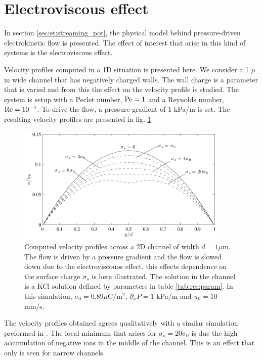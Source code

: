 \section{Electroviscous effect}
In section \ref{sec:et:streaming_pot}, the physical model behind
pressure-driven electrokinetic flow is presented. The effect of
interest that arise in this kind of systems is the electroviscous
effect.

Velocity profiles computed in a 1D situation is presented here. We
consider a 1 $\mu$m wide channel that has negatively charged
walls. The wall charge is a parameter that is varied and from this the
effect on the velocity profile is studied. The system is setup with a
Peclet number, $\mathrm{Pe} = 1$ and a Reynolds number, $\mathrm{Re} = 10^{-4}$. To
drive the flow, a pressure gradient of 1 kPa/m is set. The resulting
velocity profiles are presented in fig. \ref{fig:res:ev}.

\begin{figure}
\begin{center}
\includegraphics[width=0.9\textwidth]{fig/electrovisc.pdf}
\end{center}
\caption[Computed velocity profiles, illustrating the electroviscous
  effect.]{Computed velocity profiles across a 2D channel of width $d
  = 1 \mu$m. The flow is driven by a pressure gradient and the flow is
  slowed down due to the electroviscouos effect, this effects
  dependence on the surface charge $\sigma_s$ is here illustrated. The
  solution in the channel is a KCl solution defined by parameters in
  table \ref{tab:res:param}. In this simulation, $\sigma_0 = 0.89
  \mu$C/m$^2$, $\partial_xP = 1$ kPa/m and $u_0 = 10$ mm/s. }
\label{fig:res:ev}
\end{figure}

The velocity profiles obtained agrees qualitatively with a similar
simulation preformed in \cite{ren-elvis-paper}. The local minimum that
arises for $\sigma_s  = 20\sigma_0$ is due the high accumulation of
negative ions in the middle of the channel. This is an effect that
only is seen for narrow channels.

